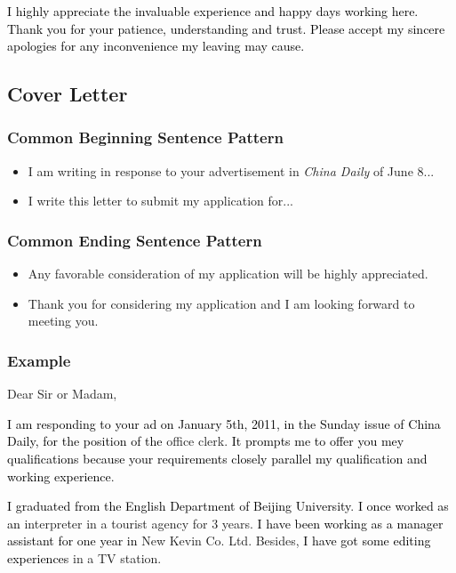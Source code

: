\documentclass{article}
\begin{document}
\par \textcolor{black}{I highly appreciate the invaluable experience and happy days working
  here. Thank you for your patience, understanding and trust. Please accept my sincere
  apologies for any inconvenience my leaving may cause.}



\subsection{Cover Letter}
\label{sec:letter}

\subsubsection{Common Beginning Sentence Pattern}
\label{sec:comm-begnn-sent}
\begin{itemize}
\item I am writing in response to your advertisement in \emph{China Daily} of June 8...
\item I write this letter to submit my application for...
\end{itemize}

\subsubsection{Common Ending Sentence Pattern}
\label{sec:comm-ending-sent-2}
\begin{itemize}
\item Any favorable consideration of my application will be highly appreciated.
\item Thank you for considering my application and I am looking forward to meeting you.
\end{itemize}

\subsubsection{Example}
\label{sec:example-2}
Dear Sir or Madam,
\par \textcolor{black}{I am responding to your ad on January 5th, 2011, in the Sunday issue of China Daily, for the position of the} office clerk. \textcolor{black}{It prompts me to offer you mey qualifications because your requirements closely parallel my qualification and working experience}. 

\par \textcolor{black}{I graduated from the English Department of Beijing
  University}. \textcolor{black}{I once worked as an} interpreter in a tourist agency for 3
years. \textcolor{black}{I have been working as a manager assistant for one year in} New
Kevin Co. Ltd. Besides, \textcolor{black}{I have got some editing experiences} in a TV
station.
\end{document}

